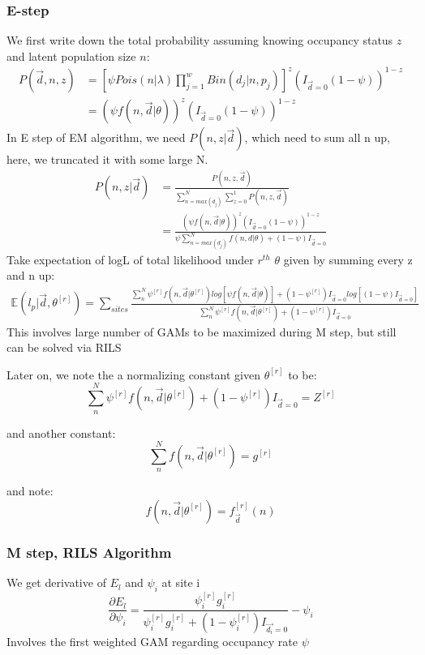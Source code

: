 \documentclass[]{article}
\begin{document}
\subsubsection{E-step}
We first write down the total probability assuming knowing occupancy status $z$ and latent population size $n$:
\begin{equation}
	\begin{aligned}
	P(\vec{d},n,z)&=[\psi Pois(n|\lambda)\prod_{j=1}^{w}Bin(d_{j}|n,p_{j})]^{z}(I_{\vec{d}=0}(1-\psi))^{1-z}\\
	&=(\psi f(n,\vec{d}|\theta))^{z}(I_{\vec{d}=0}(1-\psi))^{1-z}
	\end{aligned}
\end{equation}
In E step of EM algorithm, we need $P(n,z|\vec{d})$, which need to sum all n up, here, we truncated it with some large N.
\begin{equation}
	\begin{aligned}
	P(n,z|\vec{d})&=\frac{P(n,z,\vec{d})}{\sum_{n=max(d_{j})}^{N}\sum_{z=0}^{1}P(n,z,\vec{d})}\\
	&=\frac{(\psi f(n,\vec{d}|\theta))^{z}(I_{\vec{d}=0}(1-\psi))^{1-z}}{\psi \sum_{n=max(d_{j})}^{N}f(n,d|\theta)+(1-\psi)I_{\vec{d}=0}}
	\end{aligned}
\end{equation}
Take expectation of logL of total likelihood under $r^{th}$ $\theta$ given by summing every z and n up:
\begin{equation}
	\begin{aligned}
	\mathbb{E}(l_{p}|\vec{d},\theta^{[r]})=\sum_{sites}\frac{\sum_{n}^{N}\psi^{[r]}f(n,\vec{d}|\theta^{[r]})log[\psi f(n,\vec{d}|\theta)]+(1-\psi^{[r]})I_{\vec{d}=0}log[(1-\psi)I_{\vec{d}=0}]}{\sum_{n}^{N}\psi^{[r]}f(n,\vec{d}|\theta^{[r]})+(1-\psi^{[r]})I_{\vec{d}=0}}
	\end{aligned}
\end{equation}
This involves large number of GAMs to be maximized during M step, but still can be solved via RILS

Later on, we note the a normalizing constant given $\theta^{[r]}$ to be:
\[
\sum_{n}^{N}\psi^{[r]}f(n,\vec{d}|\theta^{[r]})+(1-\psi^{[r]})I_{\vec{d}=0}=Z^{[r]}
\]

and another constant:
\[
\sum_{n}^{N}f(n,\vec{d}|\theta^{[r]})=g^{[r]}
\]

and note:
\[
f(n,\vec{d}|\theta^{[r]})=f^{[r]}_{\vec{d}}(n)
\]

\subsubsection{M step, RILS Algorithm}
We get derivative of $E_{l}$ and $\psi_{i}$ at site i
\begin{equation}
	\frac{\partial E_{l}}{\partial \psi_{i}}=\frac{\psi_{i}^{[r]}g_{i}^{[r]}}{\psi_{i}^{[r]}g_{i}^{[r]}+(1-\psi_{i}^{[r]})I_{\vec{d_{i}}=0}}-\psi_{i}
\end{equation}
Involves the first weighted GAM regarding occupancy rate $\psi$
\end{document}

